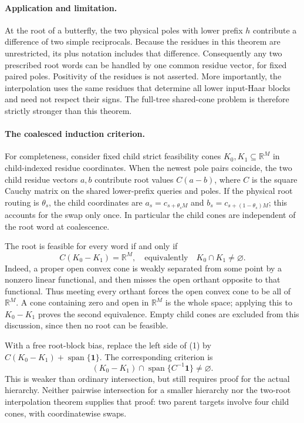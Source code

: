 \documentclass[11pt]{article}
\begin{document}
\paragraph{Application and limitation.}
At the root of a butterfly, the two physical poles with lower prefix
$h$ contribute a difference of two simple reciprocals. Because the
residues in this theorem are unrestricted, its plus notation includes
that difference. Consequently any two prescribed root words can be
handled by one common residue vector, for fixed paired poles. Positivity
of the residues is not asserted. More importantly, the interpolation
uses the same residues that determine all lower input-Haar blocks and
need not respect their signs. The full-tree shared-cone problem is
therefore strictly stronger than this theorem.

\paragraph{The coalesced induction criterion.}
For completeness, consider fixed child strict feasibility cones
$K_0,K_1\subseteq\mathbb R^M$ in child-indexed residue coordinates.
When the newest pole pairs coincide, the two child residue vectors
$a,b$ contribute root values $C(a-b)$, where $C$ is the square Cauchy
matrix on the shared lower-prefix queries and poles. If the physical
root routing is $\theta_s$, the child coordinates are
$a_s=c_{s+\theta_sM}$ and $b_s=c_{s+(1-\theta_s)M}$; this accounts
for the swap only once. In particular the child cones are independent
of the root word at coalescence.

The root is feasible for every word if and only if
\[
 C(K_0-K_1)=\mathbb R^M,
 \quad\text{equivalently}\quad K_0\cap K_1\ne\varnothing. \tag{1}
\]
Indeed, a proper open convex cone is weakly separated from some point
by a nonzero linear functional, and then misses the open orthant
opposite to that functional. Thus meeting every orthant forces the
open convex cone to be all of $\mathbb R^M$. A cone containing zero
and open in $\mathbb R^M$ is the whole space; applying this to
$K_0-K_1$ proves the second equivalence. Empty child cones are excluded
from this discussion, since then no root can be feasible.

With a free root-block bias, replace the left side of (1) by
$C(K_0-K_1)+\operatorname{span}\{\mathbf1\}$. The corresponding
criterion is
\[
 (K_0-K_1)\cap\operatorname{span}\{C^{-1}\mathbf1\}\ne\varnothing.
 \tag{2}
\]
This is weaker than ordinary intersection, but still requires proof for
the actual hierarchy. Neither pairwise intersection for a smaller
hierarchy nor the two-root interpolation theorem supplies that proof:
two parent targets involve four child cones, with coordinatewise swaps.
\end{document}
